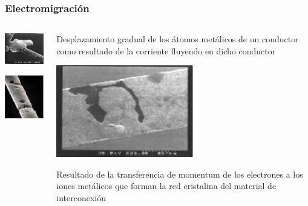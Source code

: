 \documentclass[t,aspectratio=169,10pt]{beamer}
\begin{document}
\begin{frame}
\frametitle{Electromigración}

\begin{columns}

	\begin{column}{0.4\textwidth}
 
		\centering
		\includegraphics[width=3.5cm]{migration1}
		
		\vspace{5mm}
		\includegraphics[width=3.5cm]{migration2}
  
	\end{column}
 
	\begin{column}{0.6\textwidth}
 
		Desplazamiento gradual de los átomos metálicos de un conductor como resultado de la corriente fluyendo en dicho conductor
		
		\centering
		\vspace{3mm}
		\includegraphics[width=6cm]{migration3}
		
		\vspace{3mm}
		Resultado de la transferencia de momentum de los electrones a los iones metálicos que forman la red cristalina del material de interconexión
  
	\end{column}
 
\end{columns}

\end{frame}
\end{document}

